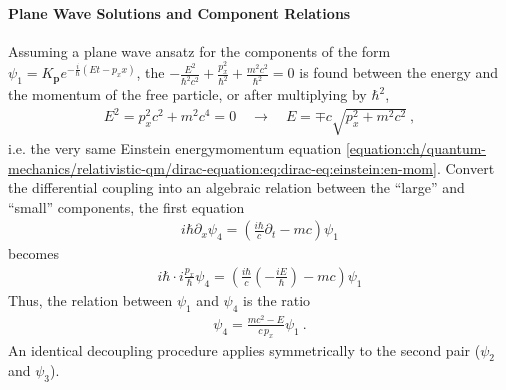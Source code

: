\documentclass[letterpaper,10pt,english]{jupyterBook}
\begin{document}
\paragraph{Plane Wave Solutions and Component Relations}
\label{\detokenize{ch/quantum-mechanics/relativistic-qm/dirac-equation:plane-wave-solutions-and-component-relations}}
\sphinxAtStartPar
Assuming a plane wave ansatz for the components of the form \(\psi_1 = K_{\mathbf{p}} e^{-\frac{i}{\hbar}(Et - p_x x)}\), the  \(- \frac{E^2}{\hbar^2 c^2} + \frac{p_x^2}{\hbar^2} + \frac{m^2 c^2}{\hbar^2} = 0\) is found between the energy and the momentum of the free particle, or after multiplying by \(\hbar^2\),
\begin{equation*}
\begin{split}E^2 = p_x^2 c^2 + m^2 c^4 = 0 \quad \rightarrow \quad E = \mp c \sqrt{ p_x^2 + m^2 c^2 } \ ,\end{split}
\end{equation*}
\sphinxAtStartPar
i.e. the very same Einstein energy\sphinxhyphen{}momentum equation \eqref{equation:ch/quantum-mechanics/relativistic-qm/dirac-equation:eq:dirac-eq:einstein:en-mom}. Convert the differential coupling into an algebraic relation between the “large” and “small” components, the first equation
\begin{equation*}
\begin{split}i\hbar \partial_x \psi_4 = \left( \frac{i\hbar}{c} \partial_t - mc \right) \psi_1\end{split}
\end{equation*}
\sphinxAtStartPar
becomes
\begin{equation*}
\begin{split}i \hbar \cdot i \frac{p_x}{\hbar} \psi_4 = \left( \frac{i\hbar}{c} \left(- \frac{i E}{\hbar} \right) - mc \right) \psi_1 \end{split}
\end{equation*}
\sphinxAtStartPar
Thus, the relation between \(\psi_1\) and \(\psi_4\) is the ratio
\begin{equation*}
\begin{split}\psi_4 = \frac{mc^2 - E}{c \, p_x} \psi_1 \ .\end{split}
\end{equation*}
\sphinxAtStartPar
An identical decoupling procedure applies symmetrically to the second pair (\(\psi_2\) and \(\psi_3\)).
\end{document}
